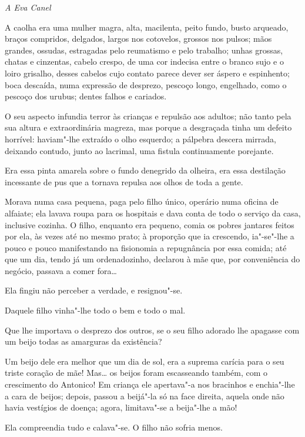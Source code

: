\hfill{}\emph{A Eva Canel}

\bigskip

\noindent{}A caolha era uma mulher magra, alta, macilenta, peito fundo, busto
arqueado, braços compridos, delgados, largos nos cotovelos, grossos nos
pulsos; mãos grandes, ossudas, estragadas pelo reumatismo e pelo
trabalho; unhas grossas, chatas e cinzentas, cabelo crespo, de uma cor
indecisa entre o branco sujo e o loiro grisalho, desses cabelos cujo
contato parece dever ser áspero e espinhento; boca descaída, numa
expressão de desprezo, pescoço longo, engelhado, como o pescoço dos
urubus; dentes falhos e cariados.

O seu aspecto infundia terror às crianças e repulsão aos adultos; não
tanto pela sua altura e extraordinária magreza, mas porque a desgraçada
tinha um defeito horrível: haviam"-lhe extraído o olho esquerdo; a
pálpebra descera mirrada, deixando contudo, junto ao lacrimal, uma
fistula continuamente porejante.

Era essa pinta amarela sobre o fundo denegrido da olheira, era essa
destilação incessante de pus que a tornava repulsa aos olhos de toda a
gente.

Morava numa casa pequena, paga pelo filho único, operário numa oficina
de alfaiate; ela lavava roupa para os hospitais e dava conta de todo o
serviço da casa, inclusive cozinha. O filho, enquanto era pequeno, comia
os pobres jantares feitos por ela, às vezes até no mesmo prato; à
proporção que ia crescendo, ia"-se"-lhe a pouco e pouco manifestando na
fisionomia a repugnância por essa comida; até que um dia, tendo já um
ordenadozinho, declarou à mãe que, por conveniência do negócio, passava
a comer fora\ldots{}

Ela fingiu não perceber a verdade, e resignou"-se.

Daquele filho vinha"-lhe todo o bem e todo o mal.

Que lhe importava o desprezo dos outros, se o seu filho adorado lhe
apagasse com um beijo todas as amarguras da existência?

Um beijo dele era melhor que um dia de sol, era a suprema carícia para o
seu triste coração de mãe! Mas\ldots{} os beijos foram escasseando também,
com o crescimento do Antonico! Em criança ele apertava"-a nos bracinhos e
enchia"-lhe a cara de beijos; depois, passou a beijá"-la só na face
direita, aquela onde não havia vestígios de doença; agora, limitava"-se a
beija"-lhe a mão!

Ela compreendia tudo e calava"-se. O filho não sofria menos.

